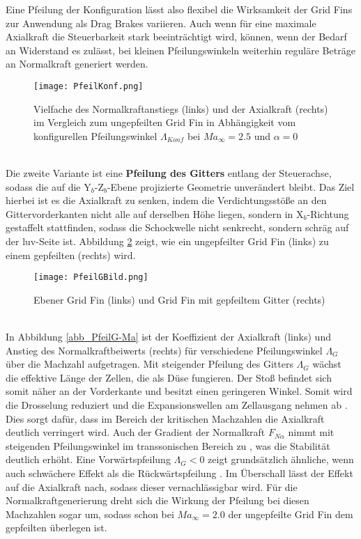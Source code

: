 Eine Pfeilung der Konfiguration lässt also flexibel die Wirksamkeit der Grid Fins zur Anwendung als Drag Brakes variieren. Auch wenn für eine maximale Axialkraft die Steuerbarkeit stark beeinträchtigt wird, können, wenn der Bedarf an Widerstand es zulässt, bei kleinen Pfeilungswinkeln weiterhin reguläre Beträge an Normalkraft generiert werden.
\begin{figure}[h]
	\centering
	\texttt{[image: PfeilKonf.png]}
	\begin{flushright}
	\end{flushright}
	\caption{Vielfache des Normalkraftanstiegs (links) und der Axialkraft (rechts) im Vergleich zum ungepfeilten Grid Fin in Abhängigkeit vom konfigurellen Pfeilungswinkel $\Lambda_{Konf}$ bei $Ma_\infty = 2.5$ und $\alpha = 0$}
	\label{abb_lastvielfache}
\end{figure}\\
Die zweite Variante ist eine \textbf{Pfeilung des Gitters} entlang der Steuerachse, sodass die auf die Y$_b$-Z$_b$-Ebene projizierte Geometrie unverändert bleibt. Das Ziel hierbei ist es die Axialkraft zu senken, indem die Verdichtungsstöße an den Gittervorderkanten nicht alle auf derselben Höhe liegen, sondern in X$_b$-Richtung gestaffelt stattfinden, sodass die Schockwelle nicht senkrecht, sondern schräg auf der luv-Seite ist. Abbildung \ref{abb_PfeilG} zeigt, wie ein ungepfeilter Grid Fin (links) zu einem gepfeilten (rechts) wird.
\begin{figure}[h]
	\centering
	\texttt{[image: PfeilGBild.png]}
	\begin{flushright}
			\flushbottom{Quelle: \cite{PfeilG3}}
	\end{flushright}
	\caption{Ebener Grid Fin (links) und Grid Fin mit gepfeiltem Gitter (rechts)}
	\label{abb_PfeilG}
\end{figure}\\
In Abbildung \ref{abb_PfeilG-Ma} ist der Koeffizient der Axialkraft (links) und Anstieg des Normalkraftbeiwerts (rechts) für verschiedene Pfeilungswinkel $\Lambda_{G}$ über die Machzahl aufgetragen. Mit steigender Pfeilung des Gitters $\Lambda_G$ wächst die effektive Länge der Zellen, die als Düse fungieren. Der Stoß befindet sich somit näher an der Vorderkante und besitzt einen geringeren Winkel. Somit wird die Drosselung reduziert und die Expansionswellen am Zellausgang nehmen ab \cite{PfeilG1}. Dies sorgt dafür, dass im Bereich der kritischen Machzahlen die Axialkraft deutlich verringert wird. Auch der Gradient der Normalkraft $F_{N\alpha}$ nimmt mit steigenden Pfeilungswinkel im transsonischen Bereich zu \cite{PfeilG1}, was die Stabilität deutlich erhöht. Eine Vorwärtspfeilung $\Lambda_{G} < 0$ zeigt grundsätzlich ähnliche, wenn auch schwächere Effekt als die Rückwärtspfeilung \cite{PfeilG2}. Im Überschall lässt der Effekt auf die Axialkraft nach, sodass dieser vernachlässigbar wird. Für die Normalkraftgenerierung dreht sich die Wirkung der Pfeilung bei diesen Machzahlen sogar um, sodass schon bei $Ma_\infty=2.0$ der ungepfeilte Grid Fin dem gepfeilten überlegen ist.


